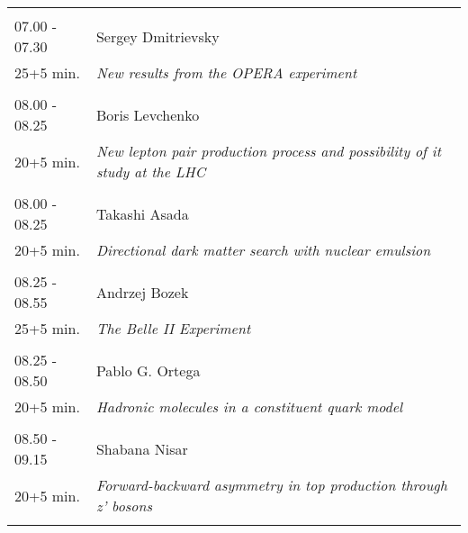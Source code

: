 \begin{longtable}{p{3cm}p{13cm}}
 & \\ 
07.00 - 07.30 & Sergey Dmitrievsky\\ 
25+5 min. & {\it New results from the OPERA experiment}\\ 
 & \\ 
08.00 - 08.25 & Boris Levchenko\\ 
20+5 min. & {\it New lepton pair production process and possibility of it study at the LHC}\\ 
 & \\ 
08.00 - 08.25 & Takashi Asada\\ 
20+5 min. & {\it Directional dark matter search with nuclear emulsion}\\ 
 & \\ 
08.25 - 08.55 & Andrzej Bozek\\ 
25+5 min. & {\it The Belle II Experiment}\\ 
 & \\ 
08.25 - 08.50 & Pablo G. Ortega\\ 
20+5 min. & {\it Hadronic molecules in a constituent quark model}\\ 
 & \\ 
08.50 - 09.15 & Shabana Nisar\\ 
20+5 min. & {\it Forward-backward asymmetry in top production through z' bosons}\\ 
 & \\ 
\end{longtable}

